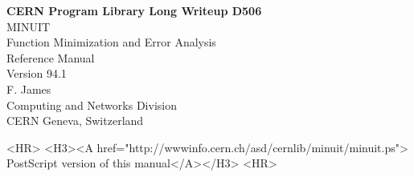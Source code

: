 \def\Ptitle#1{\special{ps: /Printstring (#1) def}
                       \epsfbox{cnastit.eps}}
\begin{htmlonly}
\begin{center}{\Large\bf CERN Program Library Long Writeup D506}\\[5mm]
{\Huge MINUIT}\\[5mm]
{\Large Function Minimization and Error Analysis}\\[5mm]
{\LARGE Reference Manual}\\[5mm]
{\LARGE Version 94.1}\\[5mm]
{\Large F. James }\\[5mm]
{\Large Computing and Networks Division}\\[5mm]
{\Large CERN Geneva, Switzerland}\\[5mm]
\end{center}

\begin{rawhtml}
<HR>
<H3><A href="http://wwwinfo.cern.ch/asd/cernlib/minuit/minuit.ps">
PostScript version of this manual</A></H3>
<HR>
\end{rawhtml}
\end{htmlonly}




